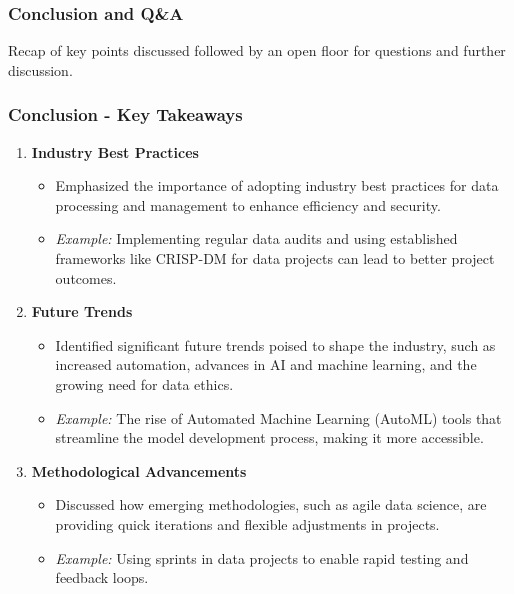 \documentclass{beamer}
\begin{document}
\begin{frame}[fragile]
    \frametitle{Conclusion and Q\&A}
    Recap of key points discussed followed by an open floor for questions and further discussion.
\end{frame}

\begin{frame}[fragile]
    \frametitle{Conclusion - Key Takeaways}
    \begin{enumerate}
        \item \textbf{Industry Best Practices}
        \begin{itemize}
            \item Emphasized the importance of adopting industry best practices for data processing and management to enhance efficiency and security.
            \item \textit{Example:} Implementing regular data audits and using established frameworks like CRISP-DM for data projects can lead to better project outcomes.
        \end{itemize}
        
        \item \textbf{Future Trends}
        \begin{itemize}
            \item Identified significant future trends poised to shape the industry, such as increased automation, advances in AI and machine learning, and the growing need for data ethics.
            \item \textit{Example:} The rise of Automated Machine Learning (AutoML) tools that streamline the model development process, making it more accessible.
        \end{itemize}
        
        \item \textbf{Methodological Advancements}
        \begin{itemize}
            \item Discussed how emerging methodologies, such as agile data science, are providing quick iterations and flexible adjustments in projects.
            \item \textit{Example:} Using sprints in data projects to enable rapid testing and feedback loops.
        \end{itemize}
    \end{enumerate}
\end{frame}
\end{document}
